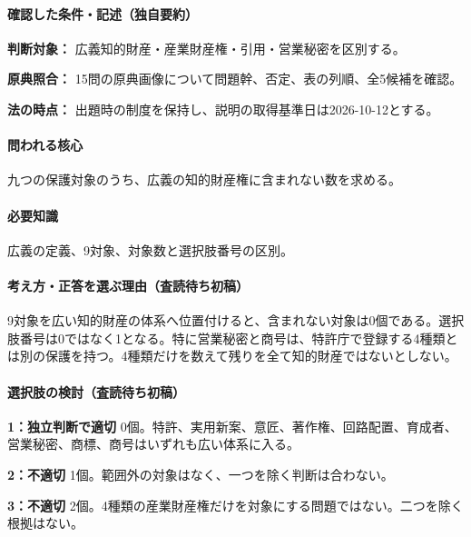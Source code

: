\paragraph{確認した条件・記述（独自要約）}\mbox{}\par

\noindent\textbf{判断対象：} 広義知的財産・産業財産権・引用・営業秘密を区別する。\par

\noindent\textbf{原典照合：} 15問の原典画像について問題幹、否定、表の列順、全5候補を確認。\par

\noindent\textbf{法の時点：} 出題時の制度を保持し、説明の取得基準日は2026-10-12とする。\par

\paragraph{問われる核心} 九つの保護対象のうち、広義の知的財産権に含まれない数を求める。

\paragraph{必要知識} 広義の定義、9対象、対象数と選択肢番号の区別。

\paragraph{考え方・正答を選ぶ理由（査読待ち初稿）} 9対象を広い知的財産の体系へ位置付けると、含まれない対象は0個である。選択肢番号は0ではなく1となる。特に営業秘密と商号は、特許庁で登録する4種類とは別の保護を持つ。4種類だけを数えて残りを全て知的財産ではないとしない。

\paragraph{選択肢の検討（査読待ち初稿）}\mbox{}\par

\noindent\textbf{1：独立判断で適切} 0個。特許、実用新案、意匠、著作権、回路配置、育成者、営業秘密、商標、商号はいずれも広い体系に入る。\par

\noindent\textbf{2：不適切} 1個。範囲外の対象はなく、一つを除く判断は合わない。\par

\noindent\textbf{3：不適切} 2個。4種類の産業財産権だけを対象にする問題ではない。二つを除く根拠はない。\par

